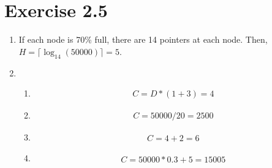 \documentclass[10pt]{article}
\begin{document}
  \section*{Exercise 2.5}
   \begin{enumerate}[label=\arabic*.]
      \item
      	If each node is 70\% full, there are 14 pointers at each node. Then, $H = \lceil \log_{14}(50000) \rceil = 5$.
      \item
      	\begin{enumerate}[label=\alph*.]
          \item
			      \begin{align}
			        C = D*(1+3) = 4
			      \end{align}
          \item
            \begin{align}
              C = 50000 / 20 = 2500
            \end{align}
          \item
            \begin{align}
              C = 4 + 2 = 6
            \end{align}
          \item
          \begin{align}
            C = 50000 * 0.3 + 5 = 15005
          \end{align}
        \end{enumerate}

  \end{enumerate}
\end{document}
